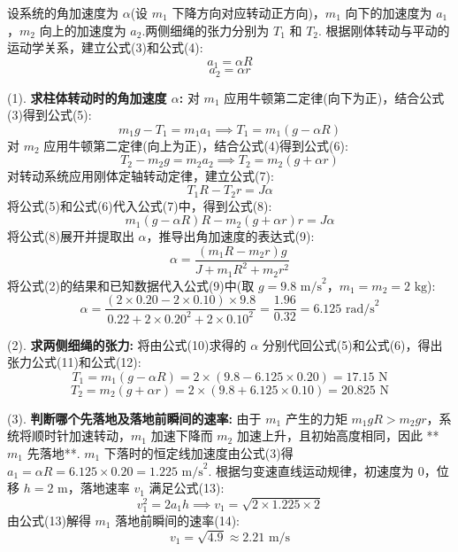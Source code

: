 设系统的角加速度为 $\alpha$(设 $m_1$ 下降方向对应转动正方向)，$m_1$ 向下的加速度为 $a_1$，$m_2$ 向上的加速度为 $a_2$.两侧细绳的张力分别为 $T_1$ 和 $T_2$.
根据刚体转动与平动的运动学关系，建立公式(3)和公式(4):
\begin{equation}
	a_1 = \alpha R
\end{equation}
\begin{equation}
	a_2 = \alpha r
\end{equation}

(1). \textbf{求柱体转动时的角加速度 $\alpha$:}
对 $m_1$ 应用牛顿第二定律(向下为正)，结合公式(3)得到公式(5):
\begin{equation}
	m_1 g - T_1 = m_1 a_1 \implies T_1 = m_1(g - \alpha R)
\end{equation}
对 $m_2$ 应用牛顿第二定律(向上为正)，结合公式(4)得到公式(6):
\begin{equation}
	T_2 - m_2 g = m_2 a_2 \implies T_2 = m_2(g + \alpha r)
\end{equation}
对转动系统应用刚体定轴转动定律，建立公式(7):
\begin{equation}
	T_1 R - T_2 r = J \alpha
\end{equation}
将公式(5)和公式(6)代入公式(7)中，得到公式(8):
\begin{equation}
	m_1(g - \alpha R)R - m_2(g + \alpha r)r = J \alpha
\end{equation}
将公式(8)展开并提取出 $\alpha$，推导出角加速度的表达式(9):
\begin{equation}
	\alpha = \frac{(m_1 R - m_2 r)g}{J + m_1 R^2 + m_2 r^2}
\end{equation}
将公式(2)的结果和已知数据代入公式(9)中(取 $g = 9.8 \text{ m/s}^2$，$m_1 = m_2 = 2 \text{ kg}$):
\begin{equation}
	\alpha = \frac{(2 \times 0.20 - 2 \times 0.10) \times 9.8}{0.22 + 2 \times 0.20^2 + 2 \times 0.10^2} = \frac{1.96}{0.32} = 6.125 \text{ rad/s}^2
\end{equation}

(2). \textbf{求两侧细绳的张力:}
将由公式(10)求得的 $\alpha$ 分别代回公式(5)和公式(6)，得出张力公式(11)和公式(12):
\begin{equation}
	T_1 = m_1(g - \alpha R) = 2 \times (9.8 - 6.125 \times 0.20) = 17.15 \text{ N}
\end{equation}
\begin{equation}
	T_2 = m_2(g + \alpha r) = 2 \times (9.8 + 6.125 \times 0.10) = 20.825 \text{ N}
\end{equation}

(3). \textbf{判断哪个先落地及落地前瞬间的速率:}
由于 $m_1$ 产生的力矩 $m_1 g R > m_2 g r$，系统将顺时针加速转动，$m_1$ 加速下降而 $m_2$ 加速上升，且初始高度相同，因此 **$m_1$ 先落地**.
$m_1$ 下落时的恒定线加速度由公式(3)得 $a_1 = \alpha R = 6.125 \times 0.20 = 1.225 \text{ m/s}^2$.
根据匀变速直线运动规律，初速度为 $0$，位移 $h = 2 \text{ m}$，落地速率 $v_1$ 满足公式(13):
\begin{equation}
	v_1^2 = 2 a_1 h \implies v_1 = \sqrt{2 \times 1.225 \times 2}
\end{equation}
由公式(13)解得 $m_1$ 落地前瞬间的速率(14):
\begin{equation}
	v_1 = \sqrt{4.9} \approx 2.21 \text{ m/s}
\end{equation}

